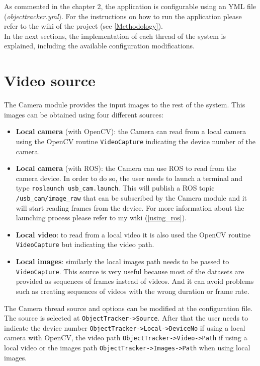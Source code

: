 As commented in the chapter 2, the application is configurable using an YML file (\textit{objecttracker.yml}). For the instructions on how to run the application please refer to the wiki of the project (see \ref{Methodology}).
\\In the next sections, the implementation of each thread of the system is explained, including the available configuration modifications.\\

\section{Video source}
The Camera module provides the input images to the rest of the system. This images can be obtained using four different sources:
\begin{itemize}
    \item \textbf{Local camera} (with OpenCV): the Camera can read from a local camera using the OpenCV routine \texttt{VideoCapture} indicating the device number of the camera.
    \item \textbf{Local camera} (with ROS): the Camera can use ROS to read from the camera device. In order to do so, the user needs to launch a terminal and type \texttt{roslaunch usb\_cam.launch}. This will publish a ROS topic \texttt{/usb\_cam/image\_raw} that can be subscribed by the Camera module and it will start reading frames from the device. For more information about the launching process please refer to my wiki (\ref{using_ros}).
    \item \textbf{Local video}: to read from a local video it is also used the OpenCV routine \texttt{VideoCapture} but indicating the video path.
\item \textbf{Local images}: similarly the local images path needs to be passed to \texttt{VideoCapture}. This source is very useful because most of the datasets are provided as sequences of frames instead of videos. And it can avoid problems such as creating sequences of videos with the wrong duration or frame rate.
\end{itemize}
The Camera thread source and options can be modified at the configuration file. The source is selected at \texttt{ObjectTracker->Source}. After that the user needs to indicate the device number \texttt{ObjectTracker->Local->DeviceNo} if using a local camera with OpenCV, the video path \texttt{ObjectTracker->Video->Path} if using a local video or the images path \texttt{ObjectTracker->Images->Path} when using local images.\\
